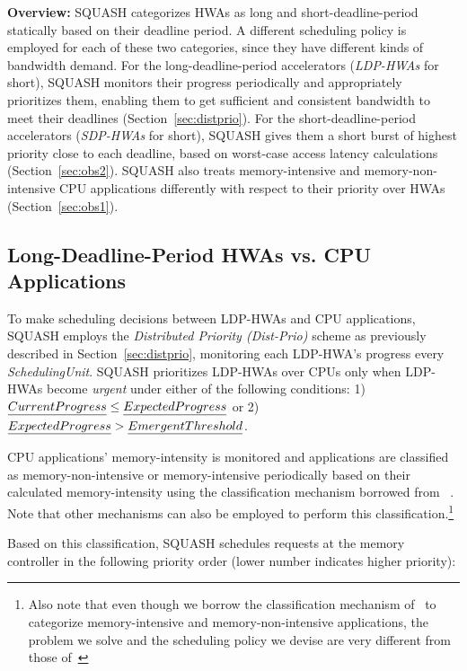 \documentclass[10pt,letterpaper]{article}
\newcommand{\kevin}[1]{}
\begin{document}
\textbf{Overview:} SQUASH categorizes HWAs as long and short-deadline-period
statically based on their deadline period. \kevin{Based on what metric? And
why?}A different scheduling policy is employed for each of these two
categories, since they have different kinds of bandwidth demand. For the
long-deadline-period accelerators (\emph{LDP-HWAs} for short), SQUASH monitors
their progress periodically and appropriately prioritizes them, enabling them
to get sufficient and consistent bandwidth to meet their deadlines (Section~\ref{sec:distprio}). For the
short-deadline-period accelerators (\emph{SDP-HWAs} for short), SQUASH gives
them a short burst of highest priority close to each deadline, based on
worst-case access latency calculations (Section~\ref{sec:obs2}). SQUASH
also treats memory-intensive and memory-non-intensive CPU applications
differently with respect to their priority over HWAs (Section~\ref{sec:obs1}).

\subsection{Long-Deadline-Period HWAs vs. CPU Applications}
\label{sec:longdeadline}

To make scheduling decisions between LDP-HWAs and CPU applications, SQUASH
employs the \emph{Distributed Priority (Dist-Prio)} scheme as previously described
in Section~\ref{sec:distprio}, monitoring each LDP-HWA's progress every
\emph{SchedulingUnit}. SQUASH prioritizes LDP-HWAs over CPUs only when LDP-HWAs
become \emph{urgent} under either of the following conditions: 1)
$\emph{CurrentProgress} \leq \emph{ExpectedProgress}$ or 2)
$\emph{ExpectedProgress} > \emph{EmergentThreshold}$.



CPU applications' memory-intensity is monitored and
applications are classified as memory-non-intensive or
memory-intensive periodically based on their calculated memory-intensity using
the classification mechanism borrowed from ~\cite{tcm}.
Note that other mechanisms can also be employed to perform this
classification.\footnote{Also note that even though we borrow the classification
mechanism of~\cite{tcm} to categorize memory-intensive and memory-non-intensive
applications, the problem we solve and the scheduling policy we devise are very
different from those of~\cite{tcm}}

Based on this classification, SQUASH schedules requests
at the memory controller in the following priority order (lower number
indicates higher priority):
\end{document}
